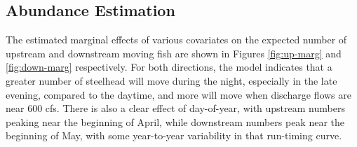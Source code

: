 \documentclass[
]{article}
\begin{document}
\begin{table}[!h]

\caption{\label{tab:pred-sthd-gam}Number of fish observed moving downstream or upstream (n Fish), less than or greater than 67 cm, and whether they were likely (> 50\% probability) to be a steelhead. Totals within each movement and size group are shown (n Sthd) as well as totals for each year by direction (Total Sthd).}
\centering
{}
\end{table}

\FloatBarrier

\hypertarget{abundance-estimation-1}{%
\subsection{Abundance Estimation}\label{abundance-estimation-1}}

The estimated marginal effects of various covariates on the expected number of upstream and downstream moving fish are shown in Figures \ref{fig:up-marg} and \ref{fig:down-marg} respectively. For both directions, the model indicates that a greater number of steelhead will move during the night, especially in the late evening, compared to the daytime, and more will move when discharge flows are near 600 cfs. There is also a clear effect of day-of-year, with upstream numbers peaking near the beginning of April, while downstream numbers peak near the beginning of May, with some year-to-year variability in that run-timing curve.
\end{document}
